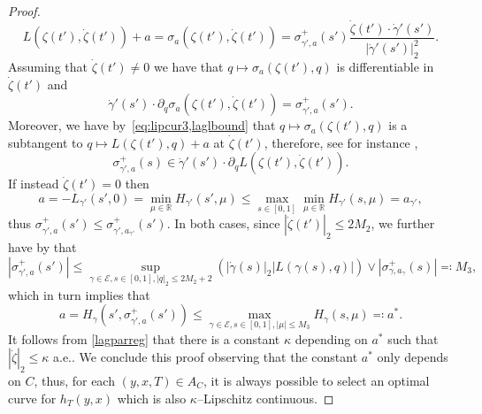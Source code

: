 \documentclass[11pt,a4paper,american]{article}
\newcommand{\Ecal}{\mathcal E}
\newcommand{\Rds}{\mathds R}
\begin{document}
\begin{proof}
        \begin{equation}\label{eq:lipcur3}
            L\left(\zeta\left(t'\right),\dot\zeta\left(t'\right)\right)+a=\sigma_a\left(\zeta\left(t'\right),\dot\zeta\left(t'\right)\right)=\sigma_{\gamma',a}^+\left(s'\right)\frac{\dot\zeta(t')\cdot\dot\gamma'(s')}{|\dot\gamma'(s')|_2^2}.
        \end{equation}
        Assuming that $\dot\zeta(t')\ne0$ we have that $q\mapsto\sigma_a(\zeta(t'),q)$ is differentiable in $\dot\zeta(t')$ and
        \begin{equation*}
            \dot\gamma'\left(s'\right)\cdot\partial_q\sigma_a\left(\zeta\left(t'\right),\dot\zeta\left(t'\right)\right)=\sigma_{\gamma',a}^+\left(s'\right).
        \end{equation*}
        Moreover, we have by~\cref{eq:lipcur3,laglbound} that $q\mapsto\sigma_a(\zeta(t'),q)$ is a subtangent to $q\mapsto L(\zeta(t'),q)+a$ at $\dot\zeta(t')$, therefore, see for instance \cite[Proposition 2.2.7]{Clarke90},
        \begin{equation*}
            \sigma_{\gamma',a}^+(s)\in\dot\gamma'\left(s'\right)\cdot\partial_q L\left(\zeta\left(t'\right),\dot\zeta\left(t'\right)\right).
        \end{equation*}
        If instead $\dot\zeta(t')=0$ then
        \begin{equation*}
            a=-L_{\gamma'}\left(s',0\right)=\min_{\mu\in\Rds}H_{\gamma'}\left(s',\mu\right)\le\max_{s\in[0,1]}\min_{\mu\in\Rds}H_{\gamma'}(s,\mu)=a_{\gamma'},
        \end{equation*}
        thus $\sigma_{\gamma',a}^+(s')\le\sigma_{\gamma',a_{\gamma'}}^+(s')$. In both cases, since $\left|\dot\zeta(t')\right|_2\le2M_2$, we further have by \cite[Corollary to Proposition 2.2.6]{Clarke90} that
        \begin{equation*}
            \left|\sigma_{\gamma',a}^+\left(s'\right)\right|\le\sup_{\gamma\in\Ecal,s\in[0,1],|q|_2\le2M_2+2}(|\dot\gamma(s)|_2|L(\gamma(s),q)|)\vee\left|\sigma_{\gamma,a_\gamma}^+(s)\right|\eqqcolon M_3,
        \end{equation*}
        which in turn implies that
        \begin{equation*}
            a=H_\gamma\left(s',\sigma_{\gamma',a}^+\left(s'\right)\right)\le\max_{\gamma\in\Ecal,s\in[0,1],|\mu|\le M_3}H_\gamma(s,\mu)\eqqcolon a^*.
        \end{equation*}
        It follows from \cref{lagparreg} that there is a constant $\kappa$ depending on $a^*$ such that $|\dot\zeta|_2\le\kappa$ a.e.. We conclude this proof observing that the constant $a^*$ only depends on $C$, thus, for each $(y,x,T)\in A_C$, it is always possible to select an optimal curve for $h_T(y,x)$ which is also $\kappa$--Lipschitz continuous.
    \end{proof}
\end{document}
